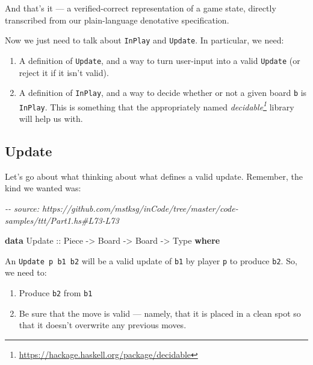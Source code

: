 \documentclass[]{article}
\newenvironment{Shaded}{}{}
\newcommand{\CommentTok}[1]{\textcolor[rgb]{0.38,0.63,0.69}{\textit{#1}}}
\newcommand{\DataTypeTok}[1]{\textcolor[rgb]{0.56,0.13,0.00}{#1}}
\newcommand{\KeywordTok}[1]{\textcolor[rgb]{0.00,0.44,0.13}{\textbf{#1}}}
\newcommand{\OtherTok}[1]{\textcolor[rgb]{0.00,0.44,0.13}{#1}}
\renewcommand{\href}[2]{#2\footnote{\url{#1}}}
\begin{document}
And that's it --- a verified-correct representation of a game state, directly
transcribed from our plain-language denotative specification.

Now we just need to talk about \texttt{InPlay} and \texttt{Update}. In
particular, we need:

\begin{enumerate}
\def\labelenumi{\arabic{enumi}.}
\tightlist
\item
  A definition of \texttt{Update}, and a way to turn user-input into a valid
  \texttt{Update} (or reject it if it isn't valid).
\item
  A definition of \texttt{InPlay}, and a way to decide whether or not a given
  board \texttt{b} is \texttt{InPlay}. This is something that the appropriately
  named \emph{\href{https://hackage.haskell.org/package/decidable}{decidable}}
  library will help us with.
\end{enumerate}

\subsection{Update}\label{update}

Let's go about what thinking about what defines a valid update. Remember, the
kind we wanted was:

\begin{Shaded}
\begin{Highlighting}[]
\CommentTok{{-}{-} source: https://github.com/mstksg/inCode/tree/master/code{-}samples/ttt/Part1.hs\#L73{-}L73}

\KeywordTok{data} \DataTypeTok{Update}\OtherTok{ ::} \DataTypeTok{Piece} \OtherTok{{-}\textgreater{}} \DataTypeTok{Board} \OtherTok{{-}\textgreater{}} \DataTypeTok{Board} \OtherTok{{-}\textgreater{}} \DataTypeTok{Type} \KeywordTok{where}
\end{Highlighting}
\end{Shaded}

An \texttt{Update\ p\ b1\ b2} will be a valid update of \texttt{b1} by player
\texttt{p} to produce \texttt{b2}. So, we need to:

\begin{enumerate}
\def\labelenumi{\arabic{enumi}.}
\tightlist
\item
  Produce \texttt{b2} from \texttt{b1}
\item
  Be sure that the move is valid --- namely, that it is placed in a clean spot
  so that it doesn't overwrite any previous moves.
\end{enumerate}
\end{document}
